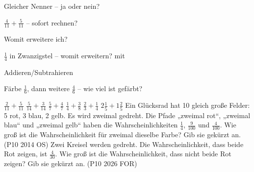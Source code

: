 \setcounter{aufgabe}{8}

\begin{aufgabe}{Gleicher Nenner – ja oder nein?}
\begin{teile}
\teil $\frac{4}{11} + \frac{5}{11}$ – sofort rechnen? \janein
\end{teile}
\end{aufgabe}

\begin{aufgabe}{Womit erweitere ich?}
\begin{teile}
\teil $\frac{1}{4}$ in Zwanzigstel – womit erweitern? mit \leerfeld
\end{teile}
\end{aufgabe}

\begin{aufgabe}{Addieren/Subtrahieren}
\begin{teile}
\teil Färbe $\frac{1}{6}$, dann weitere $\frac{4}{6}$ – wie viel ist gefärbt?

\leerfeld
\teil $\frac{2}{11} + \frac{5}{11}$
\teil $\frac{5}{14} + \frac{3}{14}$
\teil $\frac{5}{7} + \frac{4}{7}$
\teil $\frac{1}{4} + \frac{3}{8}$
\teil $\frac{2}{3} + \frac{1}{4}$
\teil $2\frac{1}{5} + 1\frac{2}{5}$
\teil Ein Glücksrad hat 10 gleich große Felder: 5 rot, 3 blau, 2 gelb. Es wird zweimal gedreht. Die Pfade „zweimal rot“, „zweimal blau“ und „zweimal gelb“ haben die Wahrscheinlichkeiten $\frac{1}{4}$, $\frac{9}{100}$ und $\frac{4}{100}$. Wie groß ist die Wahrscheinlichkeit für zweimal dieselbe Farbe? Gib sie gekürzt an. \hfill (P10 2014 OS)
\teil Zwei Kreisel werden gedreht. Die Wahrscheinlichkeit, dass beide Rot zeigen, ist $\frac{4}{30}$. Wie groß ist die Wahrscheinlichkeit, dass nicht beide Rot zeigen? Gib sie gekürzt an. \hfill (P10 2026 FOR)
\end{teile}
\end{aufgabe}

